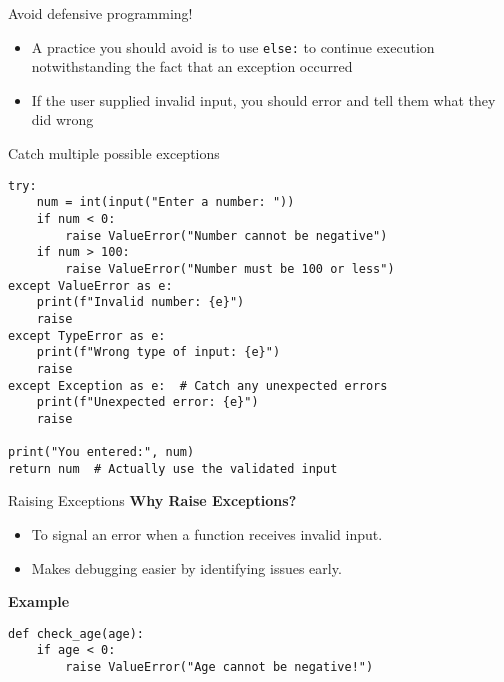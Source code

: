 \documentclass[aspectratio=169]{beamer}
\renewcommand{\emph}[1]{\textcolor{red}{#1}}
\begin{document}
\begin{frame}[fragile]{Avoid defensive programming!}
    \begin{itemize}[<+->]
        \item A practice you should avoid is to use \texttt{else:} to 
        continue execution notwithstanding the fact that an 
        exception occurred
        
        \item If the user supplied invalid input,
        you should error and tell them what they did wrong
    \end{itemize}

    \onslide<3->{\emph{Avoid defensive programming!}}
\end{frame}

\begin{frame}[fragile]{Catch multiple possible exceptions}
    \begin{lstlisting}
try:
    num = int(input("Enter a number: "))
    if num < 0:
        raise ValueError("Number cannot be negative")
    if num > 100:
        raise ValueError("Number must be 100 or less")
except ValueError as e:
    print(f"Invalid number: {e}")
    raise
except TypeError as e:
    print(f"Wrong type of input: {e}")
    raise
except Exception as e:  # Catch any unexpected errors
    print(f"Unexpected error: {e}")
    raise

print("You entered:", num)
return num  # Actually use the validated input
    \end{lstlisting}
\end{frame}

\begin{frame}[fragile]{Raising Exceptions}
    \textbf{Why Raise Exceptions?}
    \begin{itemize}
        \item To signal an error when a function receives invalid input.
        \item Makes debugging easier by identifying issues early.
    \end{itemize}

    \textbf{Example}
    \begin{lstlisting}
def check_age(age):
    if age < 0:
        raise ValueError("Age cannot be negative!")
    \end{lstlisting}
\end{frame}
\end{document}
